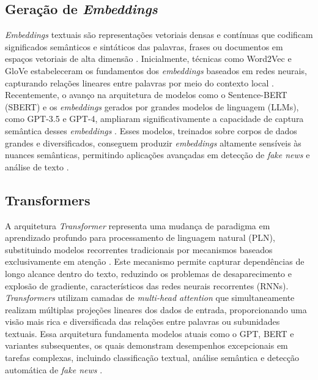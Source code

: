 \documentclass[12pt]{article}
\begin{document}
\subsection{Geração de \textit{Embeddings}}
\textit{Embeddings} textuais são representações vetoriais densas e contínuas que codificam significados semânticos e sintáticos das palavras, frases ou documentos em espaços vetoriais de alta dimensão \cite{Mikolov2013}. Inicialmente, técnicas como Word2Vec e GloVe estabeleceram os fundamentos dos \textit{embeddings} baseados em redes neurais, capturando relações lineares entre palavras por meio do contexto local \cite{Pennington2014}. Recentemente, o avanço na arquitetura de modelos como o Sentence-BERT (SBERT) e os \textit{embeddings} gerados por grandes modelos de linguagem (LLMs), como GPT-3.5 e GPT-4, ampliaram significativamente a capacidade de captura semântica desses \textit{embeddings} \cite{Reimers2019,Brown2020}. Esses modelos, treinados sobre corpos de dados grandes e diversificados, conseguem produzir \textit{embeddings} altamente sensíveis às nuances semânticas, permitindo aplicações avançadas em detecção de \textit{fake news} e análise de texto \cite{devlin2019bert}.

\subsection{Transformers}
A arquitetura \textit{Transformer} representa uma mudança de paradigma em aprendizado profundo para processamento de linguagem natural (PLN), substituindo modelos recorrentes tradicionais por mecanismos baseados exclusivamente em atenção \cite{Vaswani2017}. Este mecanismo permite capturar dependências de longo alcance dentro do texto, reduzindo os problemas de desaparecimento e explosão de gradiente, característicos das redes neurais recorrentes (RNNs). \textit{Transformers} utilizam camadas de \textit{multi-head attention} que simultaneamente realizam múltiplas projeções lineares dos dados de entrada, proporcionando uma visão mais rica e diversificada das relações entre palavras ou subunidades textuais. Essa arquitetura fundamenta modelos atuais como o GPT, BERT e variantes subsequentes, os quais demonstram desempenhos excepcionais em tarefas complexas, incluindo classificação textual, análise semântica e detecção automática de \textit{fake news} \cite{Radford2019}.
\end{document}
